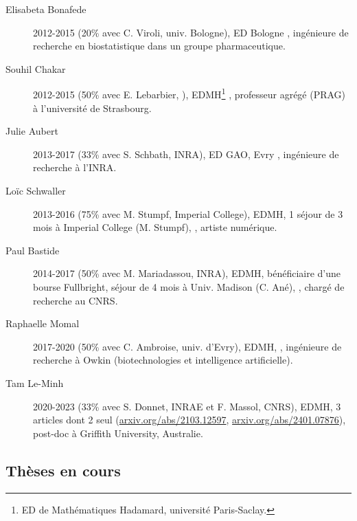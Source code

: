 \begin{description}
  \item[Elisabeta Bonafede] 2012-2015 (20\% avec C. Viroli, univ. Bologne), ED Bologne \cite{BPR15}, ingénieure de recherche en biostatistique dans un groupe pharmaceutique.
  \item[Souhil Chakar] 2012-2015 (50\% avec E. Lebarbier, \APT), EDMH\footnote{ED de Mathématiques Hadamard, université Paris-Saclay.} \cite{CLL17}, professeur agrégé (PRAG) à l'université de Strasbourg.
  \item[Julie Aubert] 2013-2017 (33\% avec S. Schbath, INRA), ED GAO, Evry \cite{ASR21}, ingénieure de recherche à l'INRA.
  \item[Loïc Schwaller] 2013-2016 (75\% avec M. Stumpf, Imperial College), EDMH, 1 séjour de 3 mois à Imperial College (M. Stumpf), 
  \cite{ScR15,ScR17,BSR19,SRS19}, artiste numérique.
  \item[Paul Bastide] 2014-2017 (50\% avec M. Mariadassou, INRA), EDMH, bénéficiaire d'une bourse Fullbright, séjour de 4 mois à Univ. Madison (C. Ané), \cite{BMR17,BAR18,BMR22,BMR24}, 
  chargé de recherche au CNRS.
  \item[Raphaelle Momal] 2017-2020 (50\% avec C. Ambroise, univ. d'Evry), EDMH, \cite{MRA20,MRA21}, ingénieure de recherche à Owkin (biotechnologies et intelligence artificielle).
  \item[Tam Le-Minh] 2020-2023 (33\% avec S. Donnet, INRAE et F. Massol, CNRS), EDMH, 3 articles \cite{LDM25} dont 2 seul (\url{arxiv.org/abs/2103.12597}, \url{arxiv.org/abs/2401.07876}), post-doc à Griffith University, Australie.
\end{description}
 
\subsection{Thèses en cours }

